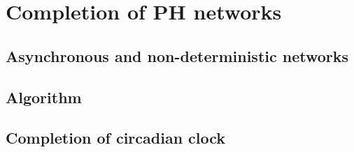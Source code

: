 
\section{Completion of PH networks}

\subsection{ Asynchronous and non-deterministic networks}

\subsection{Algorithm}

\subsection{Completion of circadian clock}